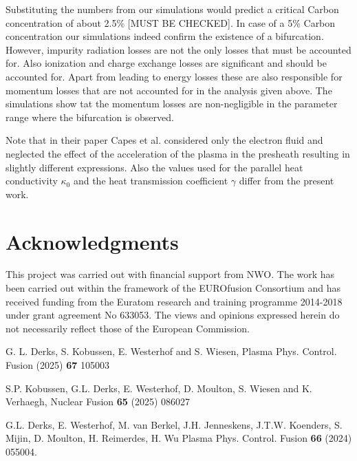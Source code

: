 \documentclass[amsmath,amssymb,a4]{revtex4-2}
\begin{document}
{\begin{equation}
\end{equation}
Substituting the numbers from our simulations would predict a critical Carbon concentration of about 2.5\% [MUST BE CHECKED]. In case of a 5\% Carbon concentration our simulations indeed confirm the existence of a bifurcation. However, impurity radiation losses are not the only losses that must be accounted for. Also ionization and charge exchange losses are significant and should be accounted for. Apart from leading to energy losses these are also responsible for momentum losses that are not accounted for in the analysis given above. The simulations show tat the momentum losses are non-negligible in the parameter range where the bifurcation is observed.

Note that in their paper Capes et al. considered only the electron fluid and neglected the effect of the acceleration of the plasma in the presheath resulting in slightly different expressions. Also the values used for the parallel heat conductivity $\kappa_0$ and the heat transmission coefficient $\gamma$ differ from the present work.

\section*{Acknowledgments}
\noindent This project was carried out with financial support from NWO. The work has been carried out within the framework of the EUROfusion Consortium and has received funding from the Euratom research and training programme 2014-2018 under grant agreement No 633053. The views and opinions expressed herein do not necessarily reflect those of the European Commission.

\begin{thebibliography}{99}


G. L. Derks, S. Kobussen, E. Westerhof and S. Wiesen,  Plasma Phys. Control. Fusion (2025) {\bf 67} 105003

S.P. Kobussen, G.L. Derks, E. Westerhof, D. Moulton, S. Wiesen and K. Verhaegh, Nuclear Fusion {\bf 65} (2025) 086027

G.L. Derks, E. Westerhof, M. {van Berkel}, J.H. Jenneskens, J.T.W. Koenders, S. Mijin, D. Moulton, H. Reimerdes, H. Wu  Plasma Phys. Control. Fusion {\bf 66} (2024) 055004.


\end{thebibliography}}
\end{document}
